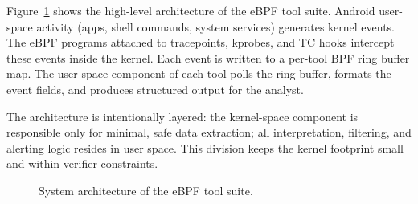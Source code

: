 \documentclass{mnitjaipur}
\begin{document}
Figure~\ref{fig:system-arch} shows the high-level architecture of the eBPF tool suite. Android user-space activity (apps, shell commands, system services) generates kernel events. The eBPF programs attached to tracepoints, kprobes, and TC hooks intercept these events inside the kernel. Each event is written to a per-tool BPF ring buffer map. The user-space component of each tool polls the ring buffer, formats the event fields, and produces structured output for the analyst.

\noindent
The architecture is intentionally layered: the kernel-space component is responsible only for minimal, safe data extraction; all interpretation, filtering, and alerting logic resides in user space. This division keeps the kernel footprint small and within verifier constraints.

\begin{figure}[H]
  \centering
  \caption{System architecture of the eBPF tool suite.}
  \label{fig:system-arch}
\end{figure}

\end{document}
